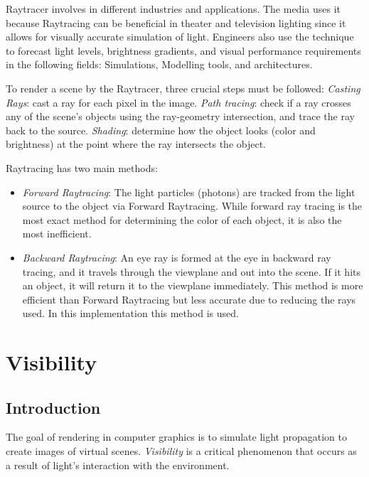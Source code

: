\documentclass{article}
\begin{document}
	\vspace*{5px}
	Raytracer involves in different industries and applications. The media uses it because Raytracing can be beneficial in theater and television lighting since it allows for visually accurate simulation of light. Engineers also use the technique to forecast light levels, brightness gradients, and visual performance requirements in the following fields: Simulations, Modelling tools, and architectures. 
	
	\vspace*{5px}
    To render a scene by the Raytracer, three crucial steps must be followed: 
	\textit{Casting Rays}: cast a ray for each pixel in the image.
	\textit{Path tracing}: check if a ray crosses any of the scene's objects using the ray-geometry intersection, and trace the ray back to the source.
	\textit{Shading}: determine how the object looks (color and brightness) at the point where the ray intersects the object.
	
	\vspace*{5px}
	Raytracing has two main methods: 
	\begin{itemize}
		\item 		\textit{Forward Raytracing}: The light particles (photons) are tracked from the light source to the object via Forward Raytracing. While forward ray tracing is the most exact method for determining the color of each object, it is also the most inefficient.
		\item 		\textit{Backward Raytracing}: 
		An eye ray is formed at the eye in backward ray tracing, and it travels through the viewplane and out into the scene. If it hits an object, it will return it to the viewplane immediately. This method is more efficient than Forward Raytracing but less accurate due to reducing the rays used. In this implementation this method is used.
	\end{itemize}
	
	\clearpage
	\section{Visibility}
	\subsection{Introduction}
	The goal of rendering in computer graphics is to simulate light propagation to create images of virtual scenes. \textit{Visibility} is a critical phenomenon that occurs as a result of light's interaction with the environment.
	
\end{document}
